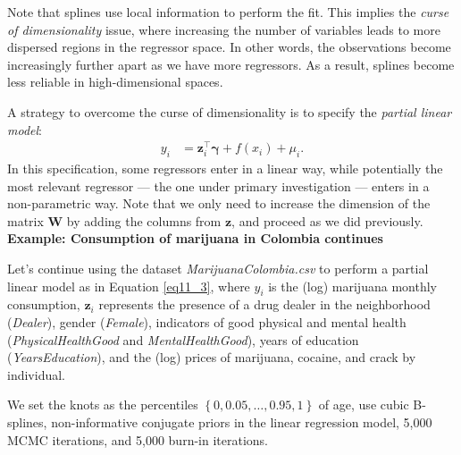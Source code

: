 Note that splines use local information to perform the fit. This implies the \textit{curse of dimensionality} issue, where increasing the number of variables leads to more dispersed regions in the regressor space. In other words, the observations become increasingly further apart as we have more regressors. As a result, splines become less reliable in high-dimensional spaces.

A strategy to overcome the curse of dimensionality is to specify the \textit{partial linear model}: 
\begin{align}\label{eq11_3} 
	y_i & = \boldsymbol{z}_i^{\top}\boldsymbol{\gamma} + f(x_i) + \mu_i. 
\end{align} 
In this specification, some regressors enter in a linear way, while potentially the most relevant regressor — the one under primary investigation — enters in a non-parametric way. Note that we only need to increase the dimension of the matrix $\boldsymbol{W}$ by adding the columns from $\boldsymbol{z}$, and proceed as we did previously.\\

\textbf{Example: Consumption of marijuana in Colombia continues}

Let's continue using the dataset \textit{MarijuanaColombia.csv} to perform a partial linear model as in Equation \ref{eq11_3}, where $y_i$ is the (log) marijuana monthly consumption, $\boldsymbol{z}_i$ represents the presence of a drug dealer in the neighborhood (\textit{Dealer}), gender (\textit{Female}), indicators of good physical and mental health (\textit{PhysicalHealthGood} and \textit{MentalHealthGood}), years of education (\textit{YearsEducation}), and the (log) prices of marijuana, cocaine, and crack by individual.

We set the knots as the percentiles $\left\{0,0.05,\dots,0.95,1\right\}$ of age, use cubic B-splines, non-informative conjugate priors in the linear regression model, 5,000 MCMC iterations, and 5,000 burn-in iterations.

